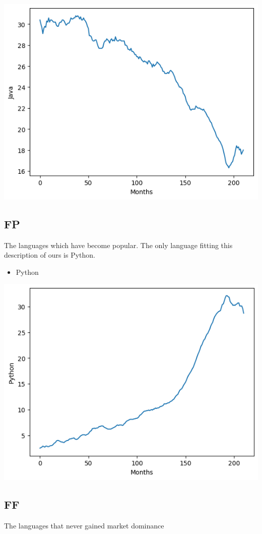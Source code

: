 \documentclass[conference]{IEEEtran}
\begin{document}
\includegraphics[scale=0.4]{lineplot/java.png}

\subsection{FP}
The languages which have become popular. The only language fitting this description of ours is Python.
\begin{itemize}
\item{Python}
\end{itemize}

\noindent
\includegraphics[scale=0.4]{lineplot/python.png}

\subsection{FF}
The languages that never gained market dominance
\end{document}
